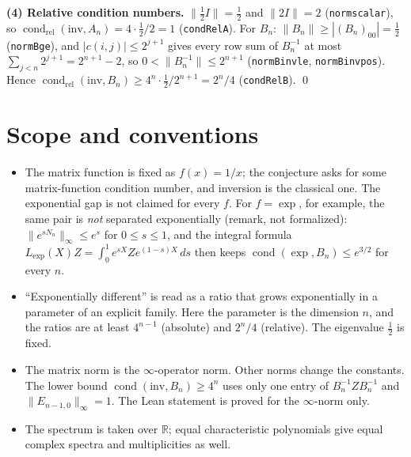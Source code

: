 \documentclass[11pt]{article}
\renewcommand{\_}{\oldus\allowbreak}
\theoremstyle{remark}
\newcommand{\R}{\mathbb{R}}
\newcommand{\cond}{\operatorname{cond}}
\begin{document}
\textbf{(4) Relative condition numbers.} $\|\tfrac12I\|=\tfrac12$ and $\|2I\|=2$
(\texttt{norm\_scalar}), so $\cond_{\mathrm{rel}}(\mathrm{inv},A_n)=4\cdot\tfrac12/2=1$
(\texttt{condRel\_A}). For $B_n$: $\|B_n\|\ge|(B_n)_{00}|=\tfrac12$ (\texttt{norm\_B\_ge}), and
$|c(i,j)|\le2^{j+1}$ gives every row sum of $B_n^{-1}$ at most
$\sum_{j<n}2^{j+1}=2^{n+1}-2$, so $0<\|B_n^{-1}\|\le2^{n+1}$ (\texttt{norm\_Binv\_le},
\texttt{norm\_Binv\_pos}). Hence $\cond_{\mathrm{rel}}(\mathrm{inv},B_n)\ge
4^n\cdot\tfrac12/2^{n+1}=2^n/4$ (\texttt{condRel\_B}).
\qed

\section{Scope and conventions}
\begin{itemize}
\item The matrix function is fixed as $f(x)=1/x$; the conjecture asks for some
matrix-function condition number, and inversion is the classical one. The exponential gap is
not claimed for every $f$. For $f=\exp$, for example, the same pair is \emph{not} separated
exponentially (remark, not formalized): $\|e^{sN_n}\|_\infty\le e^{s}$ for $0\le s\le1$, and the
integral formula $L_{\exp}(X)Z=\int_0^1e^{sX}Ze^{(1-s)X}\,ds$ then keeps
$\cond(\exp,B_n)\le e^{3/2}$ for every $n$.
\item ``Exponentially different'' is read as a ratio that grows exponentially in a parameter
of an explicit family. Here the parameter is the dimension $n$, and the ratios are at least
$4^{n-1}$ (absolute) and $2^{n}/4$ (relative). The eigenvalue $\tfrac12$ is fixed.
\item The matrix norm is the $\infty$-operator norm. Other norms change the constants. The
lower bound $\cond(\mathrm{inv},B_n)\ge4^n$ uses only one entry of $B_n^{-1}ZB_n^{-1}$ and
$\|E_{n-1,0}\|_\infty=1$. The Lean statement is proved for the $\infty$-norm only.
\item The spectrum is taken over $\R$; equal characteristic polynomials give equal complex
spectra and multiplicities as well.
\end{itemize}
\end{document}
